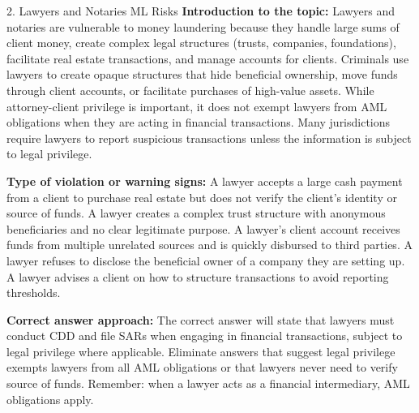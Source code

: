 \documentclass[11pt,a4paper]{beamer}
\begin{document}
\begin{frame}{2. Lawyers and Notaries ML Risks}
\tiny
\noindent\textbf{Introduction to the topic:} Lawyers and notaries are vulnerable to money laundering because they handle large sums of client money, create complex legal structures (trusts, companies, foundations), facilitate real estate transactions, and manage accounts for clients. Criminals use lawyers to create opaque structures that hide beneficial ownership, move funds through client accounts, or facilitate purchases of high-value assets. While attorney-client privilege is important, it does not exempt lawyers from AML obligations when they are acting in financial transactions. Many jurisdictions require lawyers to report suspicious transactions unless the information is subject to legal privilege.

\vspace{0.1cm}
\noindent\textbf{Type of violation or warning signs:} A lawyer accepts a large cash payment from a client to purchase real estate but does not verify the client's identity or source of funds. A lawyer creates a complex trust structure with anonymous beneficiaries and no clear legitimate purpose. A lawyer's client account receives funds from multiple unrelated sources and is quickly disbursed to third parties. A lawyer refuses to disclose the beneficial owner of a company they are setting up. A lawyer advises a client on how to structure transactions to avoid reporting thresholds.

\vspace{0.1cm}
\noindent\textbf{Correct answer approach:} The correct answer will state that lawyers must conduct CDD and file SARs when engaging in financial transactions, subject to legal privilege where applicable. Eliminate answers that suggest legal privilege exempts lawyers from all AML obligations or that lawyers never need to verify source of funds. Remember: when a lawyer acts as a financial intermediary, AML obligations apply.
\end{frame}
\end{document}
